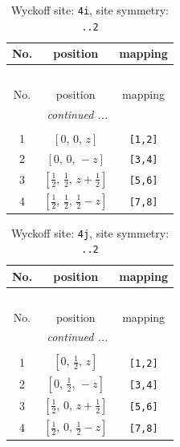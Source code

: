 \documentclass[fleqn,8pt]{jsarticle}
\begin{document}
\renewcommand{\arraystretch}{1.2}
\begin{longtable}{ccc}
\caption{Wyckoff site: {\tt 4i}, site symmetry: {\tt ..2}}
 \\
 \hline \hline
No. & position & mapping \\ \hline \endfirsthead

\multicolumn{2}{l}{\tablename\ \thetable{}} \\
 \hline \hline
No. & position & mapping \\ \hline \endhead

 \hline \hline
\multicolumn{2}{r}{\footnotesize\it continued ...} \\ \endfoot

 \hline \hline
\multicolumn{2}{r}{} \\ \endlastfoot

1 & $\left[ 0,\, 0,\, z \right]$ & {\tt [1,2]} \\ \hline
2 & $\left[ 0,\, 0,\, - z \right]$ & {\tt [3,4]} \\ \hline
3 & $\left[ \frac{1}{2},\, \frac{1}{2},\, z + \frac{1}{2} \right]$ & {\tt [5,6]} \\ \hline
4 & $\left[ \frac{1}{2},\, \frac{1}{2},\, \frac{1}{2} - z \right]$ & {\tt [7,8]} \\
\end{longtable}
\renewcommand{\arraystretch}{1.2}
\begin{longtable}{ccc}
\caption{Wyckoff site: {\tt 4j}, site symmetry: {\tt ..2}}
 \\
 \hline \hline
No. & position & mapping \\ \hline \endfirsthead

\multicolumn{2}{l}{\tablename\ \thetable{}} \\
 \hline \hline
No. & position & mapping \\ \hline \endhead

 \hline \hline
\multicolumn{2}{r}{\footnotesize\it continued ...} \\ \endfoot

 \hline \hline
\multicolumn{2}{r}{} \\ \endlastfoot

1 & $\left[ 0,\, \frac{1}{2},\, z \right]$ & {\tt [1,2]} \\ \hline
2 & $\left[ 0,\, \frac{1}{2},\, - z \right]$ & {\tt [3,4]} \\ \hline
3 & $\left[ \frac{1}{2},\, 0,\, z + \frac{1}{2} \right]$ & {\tt [5,6]} \\ \hline
4 & $\left[ \frac{1}{2},\, 0,\, \frac{1}{2} - z \right]$ & {\tt [7,8]} \\
\end{longtable}
\end{document}
